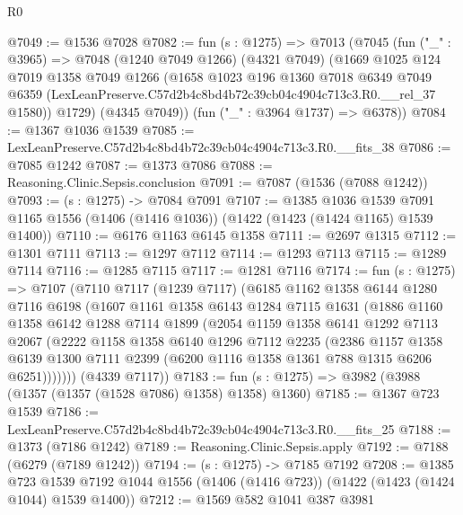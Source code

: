 \begin{lexlean}{R0}
\begin{coremodule}
@7049 := @1536 @7028
@7082 := fun (s : @1275) =>
  @7013
    (@7045
      (fun ("_" : @3965) =>
      @7048
        (@1240 @7049 @1266)
        (@4321 @7049)
        (@1669
          @1025
          @124
          @7019
          @1358
          @7049
          @1266
          (@1658
            @1023
            @196
            @1360
            @7018
            @6349
            @7049
            @6359
            (LexLeanPreserve.C57d2b4c8bd4b72c39cb04c4904c713c3.R0.__rel_37 @1580))
          @1729)
        (@4345 @7049))
      (fun ("_" : @3964 @1737) => @6378))
@7084 := @1367 @1036 @1539
@7085 := LexLeanPreserve.C57d2b4c8bd4b72c39cb04c4904c713c3.R0.__fits_38
@7086 := @7085 @1242
@7087 := @1373 @7086
@7088 := Reasoning.Clinic.Sepsis.conclusion
@7091 := @7087 (@1536 (@7088 @1242))
@7093 := (s : @1275) -> @7084 @7091
@7107 := @1385
    @1036
    @1539
    @7091
    @1165
    @1556
    (@1406 (@1416 @1036))
    (@1422 (@1423 (@1424 @1165) @1539 @1400))
@7110 := @6176 @1163 @6145 @1358
@7111 := @2697 @1315
@7112 := @1301 @7111
@7113 := @1297 @7112
@7114 := @1293 @7113
@7115 := @1289 @7114
@7116 := @1285 @7115
@7117 := @1281 @7116
@7174 := fun (s : @1275) =>
  @7107
    (@7110
      @7117
      (@1239 @7117)
      (@6185
        @1162
        @1358
        @6144
        @1280
        @7116
        @6198
        (@1607
          @1161
          @1358
          @6143
          @1284
          @7115
          @1631
          (@1886
            @1160
            @1358
            @6142
            @1288
            @7114
            @1899
            (@2054
              @1159
              @1358
              @6141
              @1292
              @7113
              @2067
              (@2222
                @1158
                @1358
                @6140
                @1296
                @7112
                @2235
                (@2386
                  @1157
                  @1358
                  @6139
                  @1300
                  @7111
                  @2399
                  (@6200 @1116 @1358 @1361 @788 @1315 @6206 @6251)))))))
      (@4339 @7117))
@7183 := fun (s : @1275) => @3982 (@3988 (@1357 (@1357 (@1528 @7086) @1358) @1358) @1360)
@7185 := @1367 @723 @1539
@7186 := LexLeanPreserve.C57d2b4c8bd4b72c39cb04c4904c713c3.R0.__fits_25
@7188 := @1373 (@7186 @1242)
@7189 := Reasoning.Clinic.Sepsis.apply
@7192 := @7188 (@6279 (@7189 @1242))
@7194 := (s : @1275) -> @7185 @7192
@7208 := @1385
    @723
    @1539
    @7192
    @1044
    @1556
    (@1406 (@1416 @723))
    (@1422 (@1423 (@1424 @1044) @1539 @1400))
@7212 := @1569 @582 @1041 @387 @3981

\end{coremodule}
\end{lexlean}
